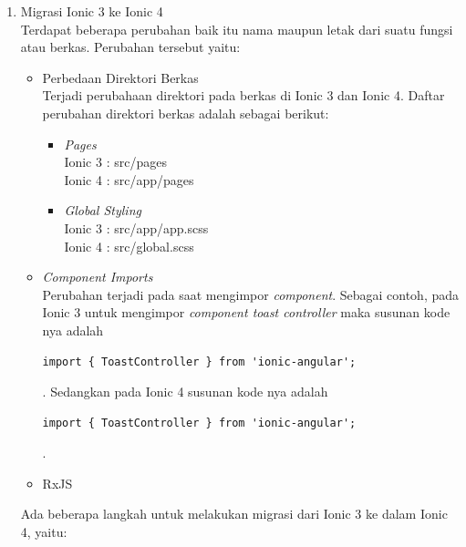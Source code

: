 \begin{enumerate}
	\item Migrasi Ionic 3 ke Ionic 4 \\
	Terdapat beberapa perubahan baik itu nama maupun letak dari suatu fungsi atau berkas. Perubahan tersebut yaitu:
	\begin{itemize}
		\item Perbedaan Direktori Berkas \\
		Terjadi perubahaan direktori pada berkas di Ionic 3 dan Ionic 4. Daftar perubahan direktori berkas adalah sebagai berikut:
		\begin{itemize}
			\item {\it Pages} \\
			Ionic 3 : src/pages  \\
			Ionic 4 : src/app/pages

			\item {\it Global Styling} \\
			Ionic 3 : src/app/app.scss \\
			Ionic 4 : src/global.scss
		\end{itemize}

		\item {\it Component Imports} \\
		Perubahan terjadi pada saat mengimpor {\it component}. Sebagai contoh, pada Ionic 3 untuk mengimpor {\it component toast controller} maka susunan kode nya adalah 
		\begin{lstlisting}[language=HTML,frame=none,caption=Import Component Ionic 3,label=lst:componentimportionic3]
       		import { ToastController } from 'ionic-angular';
    		\end{lstlisting}. Sedangkan pada Ionic 4 susunan kode nya adalah 
		\begin{lstlisting}[language=HTML,frame=none,caption=Import Component Ionic 4,label=lst:componentimportionic4]
	       	import { ToastController } from 'ionic-angular';
	   	 \end{lstlisting}.
		
		\item RxJS \\
	\end{itemize}

	Ada beberapa langkah untuk melakukan migrasi dari Ionic 3 ke dalam Ionic 4, yaitu:
	

\end{enumerate}
